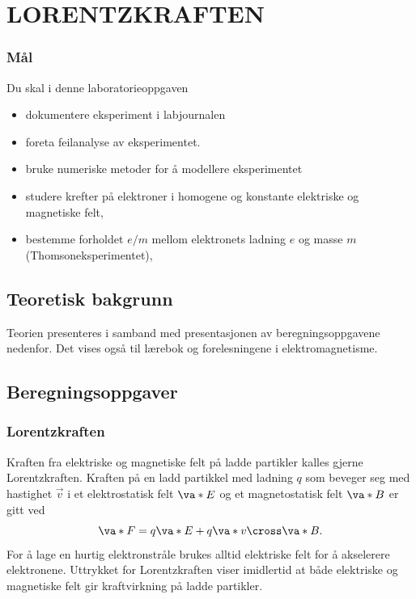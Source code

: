 \documentclass[../Elmag-labhefte-2020.tex]{subfiles}
\begin{document}
\chapter{LORENTZKRAFTEN \label{ch.lorentz}}

\subsection*{Mål}

Du skal i denne laboratorieoppgaven
%
\begin{itemize}
    \item dokumentere eksperiment i labjournalen
    \item foreta feilanalyse av eksperimentet.
    \item bruke numeriske metoder for å modellere eksperimentet
    \item studere krefter på elektroner i homogene og konstante elektriske og magnetiske felt,
    \item bestemme forholdet $e/m$ mellom elektronets ladning $e$ og masse $m$ (Thomsoneksperimentet),
\end{itemize}
%

\section{Teoretisk bakgrunn}

Teorien presenteres i samband med presentasjonen av beregningsoppgavene nedenfor. Det vises også til lærebok og forelesningene i elektromagnetisme.

\section{Beregningsoppgaver \label{ch.lorentz.beregn}}

\subsection{Lorentzkraften}

Kraften fra elektriske og magnetiske felt på ladde partikler kalles gjerne Lorentzkraften. Kraften på en ladd partikkel med ladning $q$ som beveger seg med hastighet $\vec{v}$ i et elektrostatisk felt $\va*{E}$ og et magnetostatisk felt $\va*{B}$ er gitt ved 
\begin{equation}
    \va*{F} = q \va*{E} + q \va*{v} \cross \va*{B} .
    \label{eq:lorentz.lorentz} %
\end{equation}
%
For å lage en hurtig elektronstråle brukes alltid elektriske felt for å akselerere elektronene. Uttrykket for Lorentzkraften viser imidlertid at både elektriske og magnetiske felt gir kraftvirkning på ladde partikler. 
\end{document}

